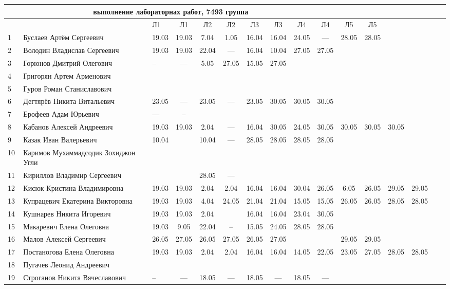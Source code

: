 \documentclass[a4paper,11pt]{article}
\begin{document}
%
\hspace{-6.1cm} %
\begin{tabular}{l|llccccccccccccc}
\multicolumn{10}{c}{выполнение лабораторнах работ, 7493 группа} \\
\toprule
&&Л1&Л1& Л2&Л2& Л3&Л3& Л4&Л4& Л5&Л5\\ 
\midrule
1\,&Буслаев Артём Сергеевич               &19.03&19.03& 7.04& 1.05&16.04&16.04&24.05& --- &28.05&28.05\\
2\,&Володин Владислав Сергеевич           &19.03&19.03&22.04& --- &16.04&10.04&27.05&27.05\\
3\,&Горюнов Дмитрий Олегович              &--   &---  & 5.05&27.05&15.05&27.05&&\\
4\,&Григорян Артем Арменович              &&&&&&&&\\
5\,&Гуров Роман Станиславович             &&&&&&&&\\
\midrule
6\,&Дегтярёв Никита Витальевич            &23.05& --- &23.05& --- &23.05&30.05&30.05&30.05\\
7\,&Ерофеев Адам Юрьевич                  &---&--&&&&&&\\
	8\,&Кабанов Алексей Андреевич             &19.03&19.03&2.04& --- &16.04&30.05&24.05&30.05&30.05&30.05&30.05\\
9\,&Казак Иван Валерьевич                 &10.04&     &10.04 & ---&28.05&28.05&28.05&28.05\\
10\,&Каримов Мухаммадсодик Зохиджон Угли  &&&&&&&&\\
\midrule
11\,&Кириллов Владимир Сергеевич          &     &     &28.05& ---&&&&\\
12\,&Кисюк Кристина Владимировна          &19.03&19.03&2.04 &2.04&16.04&16.04 &30.04&26.05&6.05&26.05&29.05&29.05\\
13\,&Купрацевич Екатерина Викторовна      &19.03&19.03& 4.04&24.05&21.04&21.04&15.05&15.05&26.05&26.05&28.05&28.05\\
14\,&Кушнарев Никита Игоревич             &19.03&19.03& 2.04&     &16.04&16.04&23.04&30.05\\
15\,&Макаревич Елена Олеговна             &19.03& 9.05&22.04& --  &15.05&24.05&28.05&28.05\\
\midrule
16\,&Малов Алексей Сергеевич              &26.05&27.05&26.05&27.05&26.05&27.05&&&29.05&29.05\\
17\,&Постаногова Елена Олеговна           &19.03&19.03&2.04&2.04&16.04&16.04&14.05&22.05&23.05&27.05&28.05&28.05\\
18\,&Пугачев Леонид Андреевич             &&&&&&&&\\
19\,&Строганов Никита Вячеславович        &--&---&18.05& --- &18.05& --- &18.05& ---\\

\bottomrule
\end{tabular}
\end{document}
